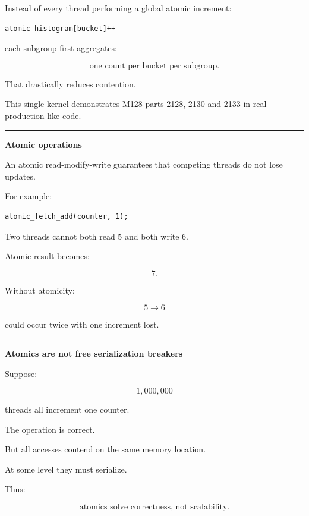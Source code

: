 Instead of every thread performing a global atomic increment:

\protect{}\label{nh6bpq}%
\begin{verbatim}
atomic histogram[bucket]++
\end{verbatim}

each subgroup first aggregates:

\[
\boxed{
\text{one count per bucket per subgroup}.
}
\]

That drastically reduces contention.

This single kernel demonstrates M128 parts 2128, 2130 and 2133 in real production-like code.

\begin{center}\rule{0.5\linewidth}{0.5pt}\end{center}

\textbf{Atomic operations}

An atomic read-modify-write guarantees that competing threads do not lose updates.

For example:

\protect{}\label{xpapkm}%
\begin{verbatim}
atomic_fetch_add(counter, 1);
\end{verbatim}

Two threads cannot both read 5 and both write 6.

Atomic result becomes:

\[
7.
\]

Without atomicity:

\[
5\rightarrow6
\]

could occur twice with one increment lost.

\begin{center}\rule{0.5\linewidth}{0.5pt}\end{center}

\textbf{Atomics are not free serialization breakers}

Suppose:

\[
1,000,000
\]

threads all increment one counter.

The operation is correct.

But all accesses contend on the same memory location.

At some level they must serialize.

Thus:

\[
\boxed{
\text{atomics solve correctness, not scalability}.
}
\]

